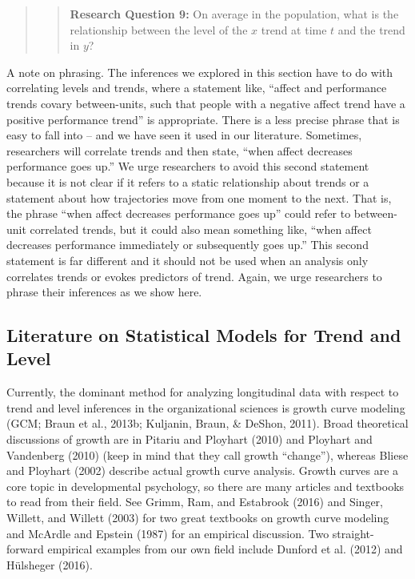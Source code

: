 \documentclass[english,,man]{apa6}
\theoremstyle{definition}
\theoremstyle{definition}
\theoremstyle{definition}
\theoremstyle{remark}
\begin{document}
\begin{quote}
\begin{quote}
\textbf{Research Question 9:} On average in the population, what is the
relationship between the level of the \(x\) trend at time \(t\) and the
trend in \(y\)?
\end{quote}
\end{quote}

A note on phrasing. The inferences we explored in this section have to
do with correlating levels and trends, where a statement like,
\enquote{affect and performance trends covary between-units, such that
people with a negative affect trend have a positive performance trend}
is appropriate. There is a less precise phrase that is easy to fall into
-- and we have seen it used in our literature. Sometimes, researchers
will correlate trends and then state, \enquote{when affect decreases
performance goes up.} We urge researchers to avoid this second statement
because it is not clear if it refers to a static relationship about
trends or a statement about how trajectories move from one moment to the
next. That is, the phrase \enquote{when affect decreases performance
goes up} could refer to between-unit correlated trends, but it could
also mean something like, \enquote{when affect decreases performance
immediately or subsequently goes up.} This second statement is far
different and it should not be used when an analysis only correlates
trends or evokes predictors of trend. Again, we urge researchers to
phrase their inferences as we show here.

\hypertarget{literature-on-statistical-models-for-trend-and-level}{%
\subsection{Literature on Statistical Models for Trend and
Level}\label{literature-on-statistical-models-for-trend-and-level}}

Currently, the dominant method for analyzing longitudinal data with
respect to trend and level inferences in the organizational sciences is
growth curve modeling (GCM; Braun et al., 2013b; Kuljanin, Braun, \&
DeShon, 2011). Broad theoretical discussions of growth are in Pitariu
and Ployhart (2010) and Ployhart and Vandenberg (2010) (keep in mind
that they call growth \enquote{change}), whereas Bliese and Ployhart
(2002) describe actual growth curve analysis. Growth curves are a core
topic in developmental psychology, so there are many articles and
textbooks to read from their field. See Grimm, Ram, and Estabrook (2016)
and Singer, Willett, and Willett (2003) for two great textbooks on
growth curve modeling and McArdle and Epstein (1987) for an empirical
discussion. Two straight-forward empirical examples from our own field
include Dunford et al. (2012) and Hülsheger (2016).
\end{document}
